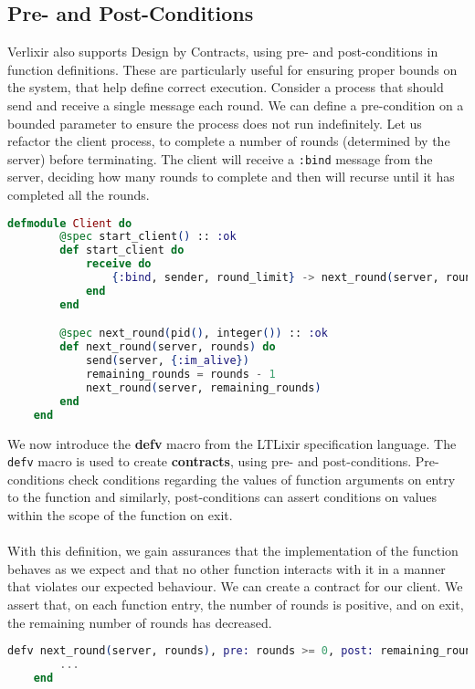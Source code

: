 \subsection{Pre- and Post-Conditions} 
Verlixir also supports Design by Contracts, using pre- and post-conditions in function definitions. These are particularly useful for ensuring proper bounds on the system, that help define correct execution. Consider a process that should send and receive a single message each round. We can define a pre-condition on a bounded parameter to ensure the process does not run indefinitely. Let us refactor the client process, to complete a number of rounds (determined by the server) before terminating. The client will receive a \texttt{:bind} message from the server, deciding how many rounds to complete and then will recurse until it has completed all the rounds.
\begin{lstlisting}[language=Elixir, xleftmargin=.3\linewidth]
    defmodule Client do
        @spec start_client() :: :ok
        def start_client do
            receive do
                {:bind, sender, round_limit} -> next_round(server, round_limit)
            end
        end

        @spec next_round(pid(), integer()) :: :ok
        def next_round(server, rounds) do
            send(server, {:im_alive})
            remaining_rounds = rounds - 1
            next_round(server, remaining_rounds)
        end
    end
\end{lstlisting}
We now introduce the \textbf{defv} macro from the LTLixir specification language. The \texttt{defv} macro is used to create \textbf{contracts}, using pre- and post-conditions. Pre-conditions check conditions regarding the values of function arguments on entry to the function and similarly, post-conditions can assert conditions on values within the scope of the function on exit. 
\\ \\
With this definition, we gain assurances that the implementation of the function behaves as we expect and that no other function interacts with it in a manner that violates our expected behaviour. We can create a contract for our client. We assert that, on each function entry, the number of rounds is positive, and on exit, the remaining number of rounds has decreased.
\begin{lstlisting}[language=Elixir, xleftmargin=.3\linewidth]
    defv next_round(server, rounds), pre: rounds >= 0, post: remaining_rounds < rounds do
        ...
    end
\end{lstlisting}
